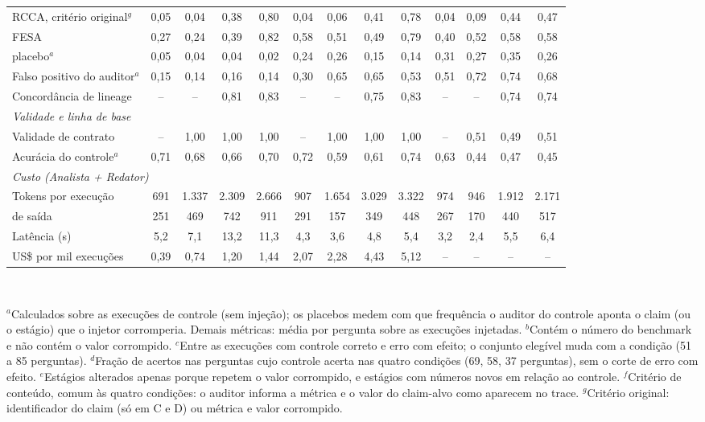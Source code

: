 \begin{table}[t]
\begin{tabular}{|l|cccc|cccc|cccc|}
RCCA, critério original$^{g}$ & 0,05 & 0,04 & 0,38 & 0,80 & 0,04 & 0,06 & 0,41 & 0,78 & 0,04 & 0,09 & 0,44 & 0,47 \\
FESA & 0,27 & 0,24 & 0,39 & 0,82 & 0,58 & 0,51 & 0,49 & 0,79 & 0,40 & 0,52 & 0,58 & 0,58 \\
\quad placebo$^{a}$ & 0,05 & 0,04 & 0,04 & 0,02 & 0,24 & 0,26 & 0,15 & 0,14 & 0,31 & 0,27 & 0,35 & 0,26 \\
Falso positivo do auditor$^{a}$ & 0,15 & 0,14 & 0,16 & 0,14 & 0,30 & 0,65 & 0,65 & 0,53 & 0,51 & 0,72 & 0,74 & 0,68 \\
Concordância de lineage & -- & -- & 0,81 & 0,83 & -- & -- & 0,75 & 0,83 & -- & -- & 0,74 & 0,74 \\
\multicolumn{13}{|l|}{\textit{Validade e linha de base}} \\
Validade de contrato & -- & 1,00 & 1,00 & 1,00 & -- & 1,00 & 1,00 & 1,00 & -- & 0,51 & 0,49 & 0,51 \\
Acurácia do controle$^{a}$ & 0,71 & 0,68 & 0,66 & 0,70 & 0,72 & 0,59 & 0,61 & 0,74 & 0,63 & 0,44 & 0,47 & 0,45 \\
\multicolumn{13}{|l|}{\textit{Custo (Analista + Redator)}} \\
Tokens por execução & 691 & 1.337 & 2.309 & 2.666 & 907 & 1.654 & 3.029 & 3.322 & 974 & 946 & 1.912 & 2.171 \\
\quad de saída & 251 & 469 & 742 & 911 & 291 & 157 & 349 & 448 & 267 & 170 & 440 & 517 \\
Latência (s) & 5,2 & 7,1 & 13,2 & 11,3 & 4,3 & 3,6 & 4,8 & 5,4 & 3,2 & 2,4 & 5,5 & 6,4 \\
US\$ por mil execuções & 0,39 & 0,74 & 1,20 & 1,44 & 2,07 & 2,28 & 4,43 & 5,12 & -- & -- & -- & -- \\
\hline
\end{tabular}
\\[2pt]{\scriptsize\raggedright $^{a}$Calculados sobre as execuções de controle (sem injeção); os placebos medem com que frequência o auditor do controle aponta o claim (ou o estágio) que o injetor corromperia. Demais métricas: média por pergunta sobre as execuções injetadas. $^{b}$Contém o número do benchmark e não contém o valor corrompido. $^{c}$Entre as execuções com controle correto e erro com efeito; o conjunto elegível muda com a condição (51 a 85 perguntas). $^{d}$Fração de acertos nas perguntas cujo controle acerta nas quatro condições (69, 58, 37 perguntas), sem o corte de erro com efeito. $^{e}$Estágios alterados apenas porque repetem o valor corrompido, e estágios com números novos em relação ao controle. $^{f}$Critério de conteúdo, comum às quatro condições: o auditor informa a métrica e o valor do claim-alvo como aparecem no trace. $^{g}$Critério original: identificador do claim (só em C e D) ou métrica e valor corrompido.\par}
\end{table}
